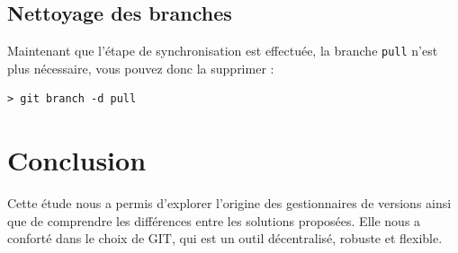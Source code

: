 \subsection{Nettoyage des branches}
\label{sec:nett-des-branch}

\par Maintenant que l'étape de synchronisation est effectuée, la branche \texttt{pull} n'est plus nécessaire, vous pouvez donc la supprimer :
\begin{verbatim}
> git branch -d pull
\end{verbatim}

\section*{Conclusion}

Cette étude nous a permis d'explorer l'origine des gestionnaires de versions ainsi que de comprendre les différences entre les solutions proposées. Elle nous a conforté dans le choix de GIT, qui est un outil décentralisé, robuste et flexible. 


